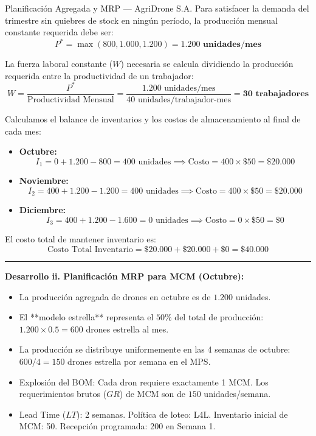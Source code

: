 \documentclass[11pt, a4paper]{article}
\begin{document}
\begin{ejercicio}{Planificación Agregada y MRP --- AgriDrone S.A.}
  Para satisfacer la demanda del trimestre sin quiebres de stock en ningún período, la producción mensual constante requerida debe ser:
  \[
    P^* = \max(800, 1.000, 1.200) = \mathbf{1.200 \text{ unidades/mes}}
  \]

  La fuerza laboral constante ($W$) necesaria se calcula dividiendo la producción requerida entre la productividad de un trabajador:
  \[
    W = \frac{P^*}{\text{Productividad Mensual}} = \frac{1.200 \text{ unidades/mes}}{40 \text{ unidades/trabajador-mes}} = \mathbf{30 \text{ trabajadores}}
  \]

  Calculamos el balance de inventarios y los costos de almacenamiento al final de cada mes:
  \begin{itemize}
    \item \textbf{Octubre:}
      \[
        I_1 = 0 + 1.200 - 800 = 400 \text{ unidades} \implies \text{Costo} = 400 \times \$50 = \$20.000
      \]
    \item \textbf{Noviembre:}
      \[
        I_2 = 400 + 1.200 - 1.200 = 400 \text{ unidades} \implies \text{Costo} = 400 \times \$50 = \$20.000
      \]
    \item \textbf{Diciembre:}
      \[
        I_3 = 400 + 1.200 - 1.600 = 0 \text{ unidades} \implies \text{Costo} = 0 \times \$50 = \$0
      \]
  \end{itemize}

  El costo total de mantener inventario es:
  \[
    \text{Costo Total Inventario} = \$20.000 + \$20.000 + \$0 = \mathbf{\$40.000}
  \]

  \rule{\textwidth}{0.2pt}

  \textbf{Desarrollo ii. Planificación MRP para MCM (Octubre):}
  \begin{itemize}
    \item La producción agregada de drones en octubre es de $1.200$ unidades.
    \item El **modelo estrella** representa el $50\%$ del total de producción: $1.200 \times 0.5 = 600$ drones estrella al mes.
    \item La producción se distribuye uniformemente en las 4 semanas de octubre: $600 / 4 = 150$ drones estrella por semana en el MPS.
    \item Explosión del BOM: Cada dron requiere exactamente 1 MCM. Los requerimientos brutos ($GR$) de MCM son de $150$ unidades/semana.
    \item Lead Time ($LT$): 2 semanas. Política de loteo: L4L. Inventario inicial de MCM: 50. Recepción programada: 200 en Semana 1.
  \end{itemize}


\end{ejercicio}
\end{document}
